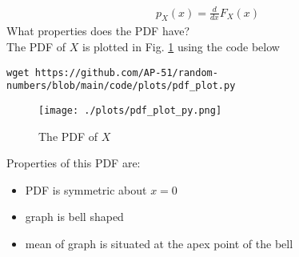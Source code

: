 \documentclass[journal,12pt,twocolumn]{IEEEtran}
\renewcommand\thesection{\arabic{section}}
\begin{document}
\begin{enumerate}[label=\thesection.\arabic*
,ref=\thesection.\theenumi]
\begin{align}
p_{X}(x) = \frac{d}{dx}F_{X}(x)
\end{align}
What properties does the PDF have?\\
\solution The PDF of $X$ is plotted in Fig. \ref{fig:gauss_pdf} using the code below
\begin{lstlisting}
wget https://github.com/AP-51/random-numbers/blob/main/code/plots/pdf_plot.py
\end{lstlisting}
\begin{figure}[h]
    \centering
    \texttt{[image: ./plots/pdf\_plot\_py.png]}
    \caption{The PDF of $X$}
    \label{fig:gauss_pdf}
    \end{figure}
Properties of this PDF are:
\begin{itemize}
    \item PDF is symmetric about $x=0$\\
    \item graph is bell shaped\\
    \item mean of graph is situated at the apex point of the bell\\
    \end{itemize}


\end{enumerate}
\end{document}
